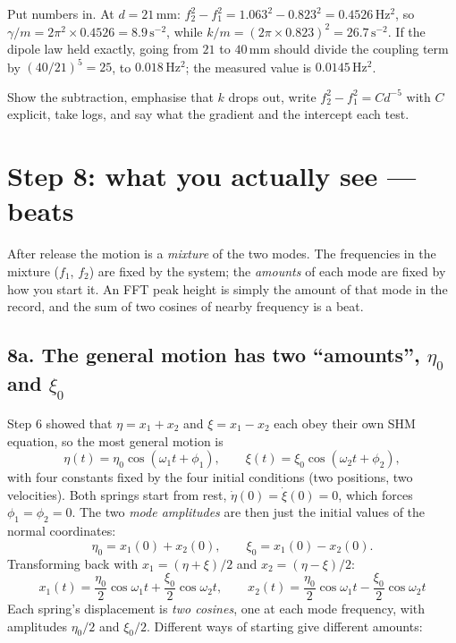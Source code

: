 \documentclass[11pt,a4paper]{article}
\newcommand{\un}[1]{\,\mathrm{#1}}
\begin{document}
\begin{selfcheck}
Put numbers in. At $d=21\un{mm}$: $f_2^2-f_1^2=1.063^2-0.823^2=0.4526\un{Hz^2}$, so $\gamma/m=2\pi^2\times0.4526=8.9\un{s^{-2}}$, while $k/m=(2\pi\times0.823)^2=26.7\un{s^{-2}}$. If the dipole law held exactly, going from $21$ to $40\un{mm}$ should divide the coupling term by $(40/21)^5=25$, to $0.018\un{Hz^2}$; the measured value is $0.0145\un{Hz^2}$.
\end{selfcheck}

\begin{ownwords}
Show the subtraction, emphasise that $k$ drops out, write $f_2^2-f_1^2=Cd^{-5}$ with $C$ explicit, take logs, and say what the gradient and the intercept each test.
\end{ownwords}

\bigskip
\section{Step 8: what you actually see --- beats}

\begin{idea}
After release the motion is a \emph{mixture} of the two modes. The frequencies in the mixture ($f_1$, $f_2$) are fixed by the system; the \emph{amounts} of each mode are fixed by how you start it. An FFT peak height is simply the amount of that mode in the record, and the sum of two cosines of nearby frequency is a beat.
\end{idea}

\subsection*{8a. The general motion has two ``amounts'', $\eta_0$ and $\xi_0$}

Step 6 showed that $\eta=x_1+x_2$ and $\xi=x_1-x_2$ each obey their own SHM equation, so the most general motion is
\[
\eta(t)=\eta_0\cos(\omega_1t+\phi_1),\qquad \xi(t)=\xi_0\cos(\omega_2t+\phi_2),
\]
with four constants fixed by the four initial conditions (two positions, two velocities). Both springs start from rest, $\dot\eta(0)=\dot\xi(0)=0$, which forces $\phi_1=\phi_2=0$. The two \emph{mode amplitudes} are then just the initial values of the normal coordinates:
\begin{equation}
\eta_0=x_1(0)+x_2(0),\qquad \xi_0=x_1(0)-x_2(0).
\label{eq:amps}
\end{equation}
Transforming back with $x_1=(\eta+\xi)/2$ and $x_2=(\eta-\xi)/2$:
\begin{equation}
\boxed{\;x_1(t)=\frac{\eta_0}{2}\cos\omega_1t+\frac{\xi_0}{2}\cos\omega_2t,\qquad
x_2(t)=\frac{\eta_0}{2}\cos\omega_1t-\frac{\xi_0}{2}\cos\omega_2t\;}
\label{eq:solution}
\end{equation}
Each spring's displacement is \emph{two cosines}, one at each mode frequency, with amplitudes $\eta_0/2$ and $\xi_0/2$. Different ways of starting give different amounts:
\end{document}
